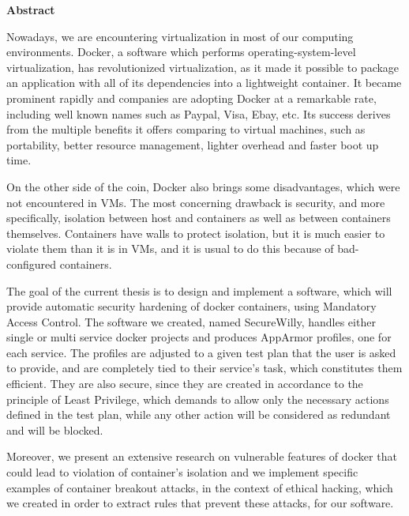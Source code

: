 \hfill\break
\begingroup
\Large{\textbf{Abstract}}
\endgroup
\hfill\break

Nowadays, we are encountering virtualization in most of our computing environments. Docker, a software which performs operating-system-level virtualization, has revolutionized virtualization, as it made it possible to package an application with all of its dependencies into a lightweight container. It became prominent rapidly and companies are adopting Docker at a remarkable rate, including well known names such as Paypal, Visa, Ebay, etc. Its success derives from the multiple benefits it offers comparing to virtual machines, such as portability, better resource management, lighter overhead and faster boot up time. 

On the other side of the coin, Docker also brings some disadvantages, which were not encountered in VMs. The most concerning drawback is security, and more specifically, isolation between host and containers as well as between containers themselves. Containers have walls to protect isolation, but it is much easier to violate them than it is in VMs, and it is usual to do this because of bad-configured containers.

The goal of the current thesis is to design and implement a software, which will provide automatic security hardening of docker containers, using Mandatory Access Control. The software we created, named SecureWilly, handles either single or multi service docker projects and produces AppArmor profiles, one for each service. The profiles are adjusted to a given test plan that the user is asked to provide, and are completely tied to their service's task, which constitutes them efficient. They are also secure, since they are created in accordance to the principle of Least Privilege, which demands to allow only the necessary actions defined in the test plan, while any other action will be considered as redundant and will be blocked.

Moreover, we present an extensive research on vulnerable features of docker that could lead to violation of container's isolation and we implement specific examples of container breakout attacks, in the context of ethical hacking, which we created in order to extract rules that prevent these attacks, for our software.


